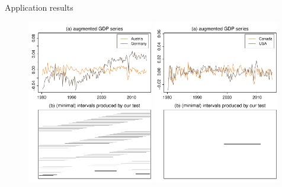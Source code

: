 \documentclass[10pt]{beamer}
\begin{document}
%
\begin{frame}{Application results}
	\begin{figure}
		\includegraphics[width=0.49\textwidth]{plots/gdp_AUT_vs_DEU_talk}
		\hfill
		\includegraphics[width=0.49\textwidth]{plots/gdp_CAN_vs_USA_talk}
	\end{figure}
\end{frame}
\end{document}
